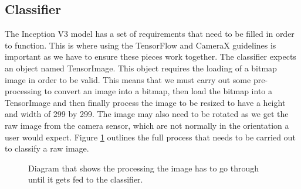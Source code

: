 \documentclass[12pt,a4paper]{report}
\begin{document}
\par

\subsection{Classifier}

The Inception V3 model has a set of requirements that need to be filled in order to function. This is where using the 
TensorFlow and CameraX guidelines is important as we have to ensure these pieces work together. The classifier expects 
an object named TensorImage. This object requires the loading of a bitmap image in order to be valid. This means that we
must carry out some pre-processing to convert an image into a bitmap, then load the bitmap into a TensorImage and then 
finally process the image to be resized to have a height and width of 299 by 299.  The image may also need to be rotated
as we get the raw image from the camera sensor, which are not normally in the orientation a user would expect.
Figure \ref{fig:classify} outlines the full process that needs to be carried out to classify a raw image.

\begin{figure}[h]
    \centering

    \caption{Diagram that shows the processing the image has to go through until it gets fed to the classifier.}
    \label{fig:classify}
\end{figure}
\end{document}
